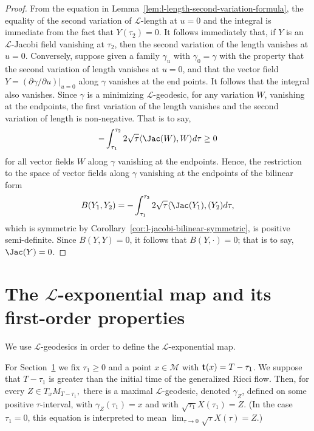 \begin{proof}
\sketch
{}
From the equation in Lemma~\ref{lem:l-length-second-variation-formula}, the equality of the second variation
of ${\mathcal L}$-length at $u=0$ and the integral is immediate from the fact
that $Y(\tau_2)=0$. It follows immediately that, if  $Y$ is an ${\mathcal
L}$-Jacobi field vanishing at $\tau_2$, then the second variation of the length
vanishes at $u=0$. Conversely, suppose given a family $\gamma_u$ with
$\gamma_0=\gamma$ with the property that the second variation of length
vanishes at $u=0$, and that the vector field $Y=(\partial\gamma/\partial
u)|_{u=0}$ along $\gamma$ vanishes at the end points. It follows that the
integral also vanishes. Since $\gamma$ is a minimizing ${\mathcal L}$-geodesic,
for any variation $W$, vanishing at the endpoints, the first variation of the
length vanishes and the second variation of length is non-negative. That is to
say,
$$-\int_{\tau_1}^{\tau_2}2\sqrt{\tau}\langle \Jac(W),W\rangle d\tau\ge 0$$
for all vector fields $W$ along $\gamma$ vanishing at the endpoints.
Hence, the restriction to the space of vector fields along $\gamma$
vanishing at the endpoints of the bilinear form
$$B(Y_1,Y_2)=-\int_{\tau_1}^{\tau_2}2\sqrt{\tau}\langle
\Jac(Y_1),(Y_2)d\tau,$$ which is symmetric by Corollary~\ref{cor:l-jacobi-bilinear-symmetric}, is
positive semi-definite. Since $B(Y,Y)=0$, it follows that $B(Y,\cdot)=0$; that
is to say, $\Jac(Y)=0$.
\end{proof}


\section{The ${\mathcal L}$-exponential map and its first-order
properties}\label{sect:Lexp}

We use  ${\mathcal L}$-geodesics in order to define the ${\mathcal
L}$-exponential map.

For Section~\ref{sect:Lexp} we fix $\tau_1\ge 0$ and a point $x\in
{\mathcal M}$ with ${\bf t}(x)=T-\tau_1$. We suppose that $T-\tau_1$
is greater than the initial time of the generalized Ricci flow.
Then, for every $Z \in T_{x}M_{T-\tau_1},$ there is a maximal
$\mathcal{L}$-geodesic, denoted $\gamma_{Z}$, defined on some
positive $\tau$-interval, with $\gamma_{Z}(\tau_1)=x$ and with
$\sqrt{\tau_1}X(\tau_1)=Z$. (In the case $\tau_1=0$, this equation
is interpreted to mean $\lim_{\tau\rightarrow 0} \sqrt{\tau}X(\tau)
= Z$.)

